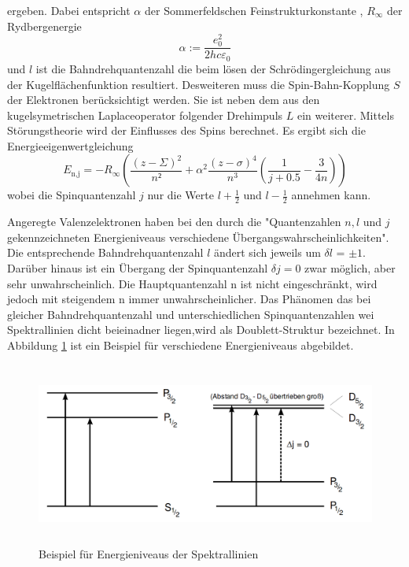 ergeben. Dabei entspricht $\alpha$ der Sommerfeldschen Feinstrukturkonstante , $R_{\infty}$ der Rydbergenergie
\begin{equation}
  \alpha := \frac{e_0^2}{2 h c \varepsilon_0}
  \label{eqn:alpha}
\end{equation}
und $l$ ist die Bahndrehquantenzahl die beim lösen der Schrödingergleichung aus der Kugelflächenfunktion resultiert.
Desweiteren muss die Spin-Bahn-Kopplung $S$ der Elektronen berücksichtigt werden. Sie ist neben dem aus den kugelsymetrischen Laplaceoperator folgender Drehimpuls $L$ ein weiterer. Mittels Störungstheorie wird der Einflusses des Spins berechnet. Es ergibt sich die Energieeigenwertgleichung
\begin{equation}
  E_\text{n,j} = -R_{\infty}\left( \frac{(z - \Sigma)^2}{n²} + \alpha^2 \frac{(z - \sigma)^4}{n^3} \left( \frac{1}{j + 0.5} - \frac{3}{4n} \right) \right)
  \label{<++>}
\end{equation}
wobei die Spinquantenzahl $j$ nur die Werte $l + \frac{1}{2}$ und $l - \frac{1}{2}$ annehmen kann.

Angeregte Valenzelektronen haben bei den durch die "Quantenzahlen $n ,l$ und $j$ gekennzeichneten Energieniveaus verschiedene Übergangswahrscheinlichkeiten".	Die entsprechende Bahndrehquantenzahl $l$ ändert sich jeweils um $\delta l$ = $\pm 1$. Darüber hinaus ist ein Übergang der Spinquantenzahl $\delta j = 0$ zwar möglich, aber sehr unwahrscheinlich. Die Hauptquantenzahl n ist nicht eingeschränkt, wird jedoch mit steigendem n immer unwahrscheinlicher. Das Phänomen das bei gleicher Bahndrehquantenzahl und unterschiedlichen Spinquantenzahlen wei Spektrallinien dicht beieinadner liegen,wird als Doublett-Struktur bezeichnet. In Abbildung \ref{fig:ene} ist ein Beispiel für verschiedene Energieniveaus abgebildet.
\begin{figure}
  \centering
  \includegraphics[height=6cm]{picture/eniv.png}
  \caption{Beispiel für Energieniveaus der Spektrallinien \cite{sample}}
  \label{fig:ene}
\end{figure}

